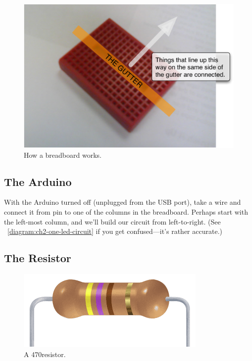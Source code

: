 \begin{figure}[h]
  \begin{center}
    \includegraphics[width=0.8\linewidth]{images/ch2-little-red-breadboard-connections}
    \caption{How a breadboard works.}
    \label{diagram:ch2-little-red-breadboard-connections}
  \end{center}
\end{figure}

\subsection{The Arduino}
With the Arduino turned off (unplugged from the USB port), take a wire and connect it from pin \chtwopin to one of the columns in the breadboard. Perhaps start with the left-most column, and we'll build our circuit from left-to-right. (See ~\vref{diagram:ch2-one-led-circuit} if you get confused---it's rather accurate.) 

\subsection{The Resistor}
\begin{figure}
	  \begin{center}
    	\includegraphics[width=0.9\linewidth]{images/20100109-470-ohm-resistor}
			\captionsetup{labelformat=empty,justification=centering}%
   		\caption{A 470\ohm resistor.}
  \end{center}
\end{figure}

